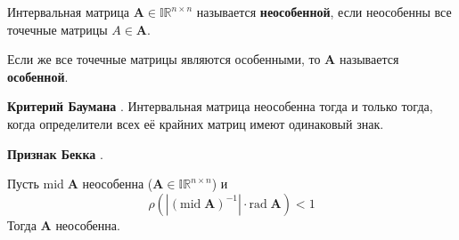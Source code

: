\begin{definition}
	Интервальная матрица $\mathbf{A} \in \mathbb{IR}^{n \times n}$ называется \textbf{неособенной}, 
	если неособенны все точечные матрицы $A \in \mathbf{A}$. 
\end{definition}

\begin{definition}
	Если же все точечные матрицы являются особенными, то  $\mathbf{A}$ называется \textbf{особенной}.
\end{definition}

\begin{theorem}
	\textbf{Критерий Баумана} \cite{bazhenov}. Интервальная матрица неособенна тогда и только тогда, когда определители всех её крайних матриц имеют одинаковый знак.
\end{theorem}


\begin{theorem}
	\textbf{Признак Бекка} \cite{bazhenov}.
\end{theorem} 
Пусть $\textrm{mid} \; \mathbf{A}$ неособенна ($\mathbf{A} \in \mathbb{IR}^{n \times n}$) и
	$$\rho(|(\textrm{mid} \; \mathbf{A})^{-1}| \cdot \textrm{rad} \; \mathbf{A}) < 1$$
	Тогда $\mathbf{A}$ неособенна.
